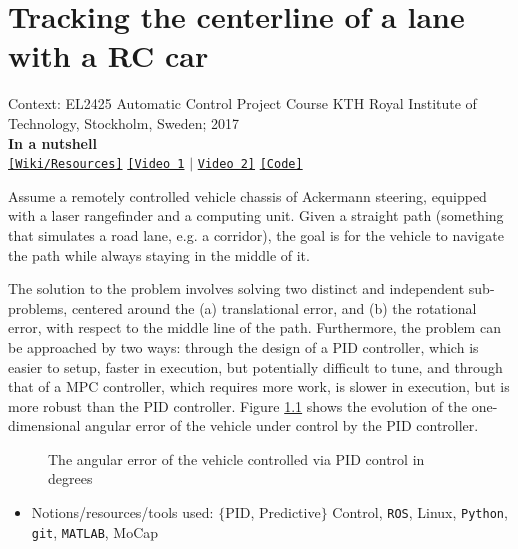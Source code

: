 \chapter{Tracking the centerline of a lane with a RC car}

\noindent Context: EL2425 Automatic Control Project Course
\noindent KTH Royal Institute of Technology, Stockholm, Sweden; 2017\\

\noindent \textbf{In a nutshell}\\
\noindent \href{https://github.com/li9i/HT16_P2_EL2425_resources}{\texttt{[Wiki/Resources]}} \href{https://www.youtube.com/watch?v=w3Wnw5SLmss}{\texttt{[Video 1}} $|$ \href{https://youtu.be/937OZez1iN8?t=142}{\texttt{Video 2]}} \href{https://github.com/li9i/HT16_P2_EL2425}{\texttt{[Code]}}\\

\begin{problem}
Assume a remotely controlled vehicle chassis of Ackermann
steering, equipped with a laser rangefinder and a computing unit. Given a
straight path (something that simulates a road lane, e.g. a corridor), the goal
is for the vehicle to navigate the path while always staying in the middle of it.
\end{problem}

The solution to the problem involves solving two distinct and independent
sub-problems, centered around the (a) translational error, and (b) the
rotational error, with respect to the middle line of the path. Furthermore, the
problem can be approached by two ways: through the design of a PID controller,
which is easier to setup, faster in execution, but potentially difficult to
tune, and through that of a MPC controller, which requires more work, is slower
in execution, but is more robust than the PID controller. Figure
\ref{fig:centerline_pid_error} shows the evolution of the one-dimensional
angular error of the vehicle under control by the PID controller.

\begin{figure}[H]\centering
  \scalebox{0.6}{}
  \caption{\small The angular error of the vehicle controlled via PID control
           in degrees}
  \label{fig:centerline_pid_error}
\end{figure}

\vspace{-0.5cm}

\begin{itemize}
  \item Notions/resources/tools used: $\{$PID, Predictive$\}$ Control, \texttt{ROS},  Linux, \texttt{Python}, \texttt{git}, \texttt{MATLAB}, MoCap
\end{itemize}
